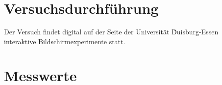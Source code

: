 


\section{Versuchsdurchführung}
Der Versuch findet digital auf der Seite der Universität \"Duisburg-Essen interaktive Bildschirmexperimente\" \cite{online} statt.
\section{Messwerte}

\label{sec:Durchführung}



